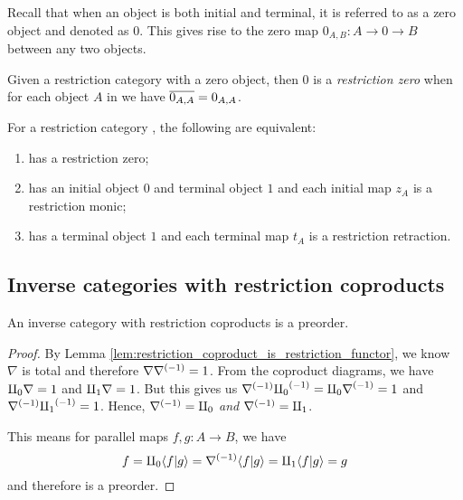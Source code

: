 Recall that when an object is both initial and terminal, it is referred to as a zero object and
denoted as $0$. This gives rise to the zero map $0_{A,B}: A \to 0 \to B$ between any two objects.

\begin{definition}\label{def:restriction_zero}
  Given a restriction category \X with a zero object, then $0$ is a \emph{restriction zero} when
  for each object $A$ in \X we have $\overline{0_{A,A}} = 0_{A,A}$.
\end{definition}

\begin{lemma}\label{lem:restriction_zero_equivalences}
  For a restriction category \X, the following are equivalent:
  \begin{enumerate}[{(}i{)}]
    \item \X has a restriction zero;
    \item \X has an initial object $0$ and terminal object $1$ and each initial map $z_A$ is a
      restriction monic;
    \item \X has a terminal object $1$ and each terminal map $t_A$ is a restriction retraction.
  \end{enumerate}
\end{lemma}




\subsection{Inverse categories with restriction coproducts} %
\label{sub:inverse_categories_with_restriction_coproducts}


\begin{proposition}
  An inverse category \X with restriction coproducts is a preorder.
\end{proposition}
\begin{proof}
  By Lemma \ref{lem:restriction_coproduct_is_restriction_functor}, we know $\nabla$ is total and
  therefore $\nabla{\nabla}^{(-1)} = 1$. From the coproduct diagrams, we have $\amalg_{0}\nabla =1$ and
  $\amalg_{1}\nabla = 1$. But this gives us ${\nabla}^{(-1)}{\amalg_{0}}^{(-1)} = {\amalg_{0}\nabla}^{(-1)} = 1$ and
  ${\nabla}^{(-1)}{\amalg_{1}}^{(-1)} =1$. Hence, ${\nabla}^{(-1)} = \amalg_{0}$ \emph{and} ${\nabla}^{(-1)} = \amalg_{1}$.

  This means for parallel maps $f,g:A \to B$, we have
  \[
    f = \amalg_{0} \langle f|g\rangle = {\nabla}^{(-1)} \langle f|g\rangle = \amalg_{1}\langle f|g\rangle = g
  \]
  and therefore \X is a preorder.
\end{proof}

